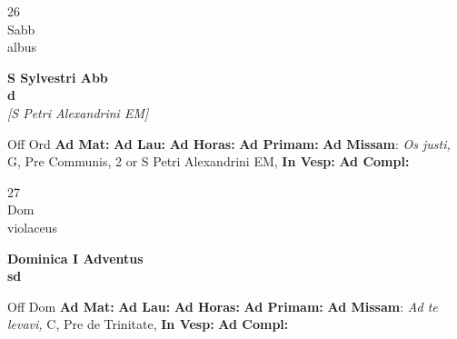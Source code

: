 \documentclass[10pt, openany]{book}
\begin{document}
    \begin{center}
        \begin{minipage}{3.5in}
            \vspace{2em}
            \begin{minipage}{0.5in}
                {\Huge 26} \\
                {\normalsize Sabb} \\
                {\normalsize albus}
            \end{minipage}
            \begin{minipage}{3.0in}
                \textbf{ \large S Sylvestri Abb \\
                \textnormal{\normalsize d}} \\ \textit{[S Petri Alexandrini EM]} \\ 
            \end{minipage}
            \begin{justify}Off Ord
                \textbf{Ad Mat: }
                \textbf{Ad Lau: }
                \textbf{Ad Horas: }
                \textbf{Ad Primam: }\textbf{Ad Missam}: \textit{Os justi,} G, Pre Communis, 2 or S Petri Alexandrini EM,  
                \textbf{In Vesp: }
                \textbf{Ad Compl: }
            \end{justify}
        \end{minipage}
    \end{center}

    \begin{center}
        \begin{minipage}{3.5in}
            \vspace{2em}
            \begin{minipage}{0.5in}
                {\Huge 27} \\
                {\normalsize Dom} \\
                {\normalsize violaceus}
            \end{minipage}
            \begin{minipage}{3.0in}
                \textbf{ \large Dominica I Adventus \\
                \textnormal{\normalsize sd}} \\ 
            \end{minipage}
            \begin{justify}Off Dom
                \textbf{Ad Mat: }
                \textbf{Ad Lau: }
                \textbf{Ad Horas: }
                \textbf{Ad Primam: }\textbf{Ad Missam}: \textit{Ad te levavi,} C, Pre de Trinitate,  
                \textbf{In Vesp: }
                \textbf{Ad Compl: }
            \end{justify}
        \end{minipage}
    \end{center}
\end{document}

